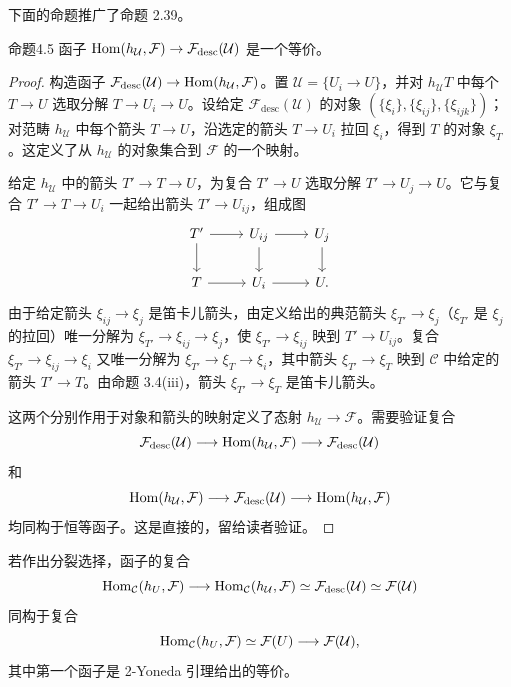 下面的命题推广了命题 2.39。

\begin{origstatement}{命题}{4.5}\label{ch04:prop45}
函子 $\operatorname{Hom}(h_{\mathcal U},\mathcal F)\to\mathcal F_{\mathrm{desc}}(\mathcal U)$ 是一个等价。
\end{origstatement}
\begin{proof}
构造函子 $\mathcal F_{\mathrm{desc}}(\mathcal U)\to\operatorname{Hom}(h_{\mathcal U},\mathcal F)$。置 $\mathcal U=\{U_i\to U\}$，并对 $h_{\mathcal U}T$ 中每个 $T\to U$ 选取分解 $T\to U_i\to U$。设给定 $\mathcal F_{\mathrm{desc}}(\mathcal U)$ 的对象 $(\{\xi_i\},\{\xi_{ij}\},\{\xi_{ijk}\})$；对范畴 $h_{\mathcal U}$ 中每个箭头 $T\to U$，沿选定的箭头 $T\to U_i$ 拉回 $\xi_i$，得到 $T$ 的对象 $\xi_T$。这定义了从 $h_{\mathcal U}$ 的对象集合到 $\mathcal F$ 的一个映射。

给定 $h_{\mathcal U}$ 中的箭头 $T'\to T\to U$，为复合 $T'\to U$ 选取分解 $T'\to U_j\to U$。它与复合 $T'\to T\to U_i$ 一起给出箭头 $T'\to U_{ij}$，组成图
\[
\begin{tikzcd}
 T'\arrow[r]\arrow[d]&U_{ij}\arrow[r]\arrow[d]&U_j\arrow[d]\\
 T\arrow[r]&U_i\arrow[r]&U.
\end{tikzcd}
\]
由于给定箭头 $\xi_{ij}\to\xi_j$ 是笛卡儿箭头，由定义给出的典范箭头 $\xi_{T'}\to\xi_j$（$\xi_{T'}$ 是 $\xi_j$ 的拉回）唯一分解为 $\xi_{T'}\to\xi_{ij}\to\xi_j$，使 $\xi_{T'}\to\xi_{ij}$ 映到 $T'\to U_{ij}$。复合 $\xi_{T'}\to\xi_{ij}\to\xi_i$ 又唯一分解为 $\xi_{T'}\to\xi_T\to\xi_i$，其中箭头 $\xi_{T'}\to\xi_T$ 映到 $\mathcal C$ 中给定的箭头 $T'\to T$。由命题 3.4(iii)，箭头 $\xi_{T'}\to\xi_T$ 是笛卡儿箭头。

这两个分别作用于对象和箭头的映射定义了态射 $h_{\mathcal U}\to\mathcal F$。需要验证复合
\[
 \mathcal F_{\mathrm{desc}}(\mathcal U)\longrightarrow\operatorname{Hom}(h_{\mathcal U},\mathcal F)
 \longrightarrow\mathcal F_{\mathrm{desc}}(\mathcal U)
\]
和
\[
 \operatorname{Hom}(h_{\mathcal U},\mathcal F)\longrightarrow\mathcal F_{\mathrm{desc}}(\mathcal U)
 \longrightarrow\operatorname{Hom}(h_{\mathcal U},\mathcal F)
\]
均同构于恒等函子。这是直接的，留给读者验证。
\end{proof}

若作出分裂选择，函子的复合
\[
 \operatorname{Hom}_{\mathcal C}(h_U,\mathcal F)\longrightarrow\operatorname{Hom}_{\mathcal C}(h_{\mathcal U},\mathcal F)
 \simeq\mathcal F_{\mathrm{desc}}(\mathcal U)\simeq\mathcal F(\mathcal U)
\]
同构于复合
\[
 \operatorname{Hom}_{\mathcal C}(h_U,\mathcal F)\simeq\mathcal F(U)\longrightarrow\mathcal F(\mathcal U),
\]
其中第一个函子是 2-Yoneda 引理给出的等价。

